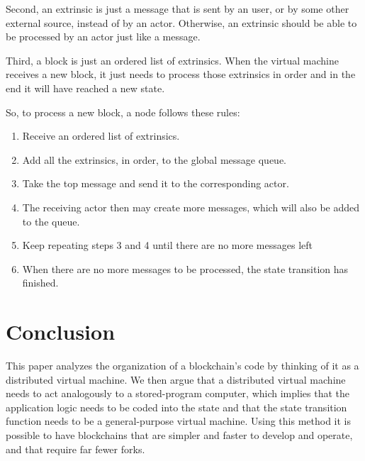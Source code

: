 \documentclass[conference]{IEEEtran}
\begin{document}
Second, an extrinsic is just a message that is sent by an user, or by some other external source, instead of by an actor. Otherwise, an extrinsic should be able to be processed by an actor just like a message.

Third, a block is just an ordered list of extrinsics. When the virtual machine receives a new block, it just needs to process those extrinsics in order and in the end it will have reached a new state.

So, to process a new block, a node follows these rules:

\begin{enumerate}
	\item Receive an ordered list of extrinsics.
	\item Add all the extrinsics, in order, to the global message queue.
	\item Take the top message and send it to the corresponding actor.
	\item The receiving actor then may create more messages, which will also be added to the queue.
	\item Keep repeating steps 3 and 4 until there are no more messages left
	\item When there are no more messages to be processed, the state transition has finished.
\end{enumerate}

\section{Conclusion}
This paper analyzes the organization of a blockchain's code by thinking of it as a distributed virtual machine. We then argue that a distributed virtual machine needs to act analogously to a stored-program computer, which implies that the application logic needs to be coded into the state and that the state transition function needs to be a general-purpose virtual machine. Using this method it is possible to have blockchains that are simpler and faster to develop and operate, and that require far fewer forks.




\end{document}
